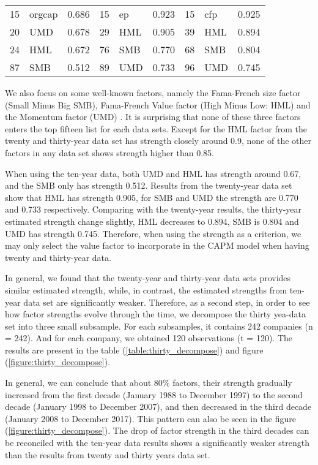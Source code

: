 \begin{table}[]
\begin{tabular}{llc|llc|llc}
		15 & orgcap         & 0.686    &15      & ep            & 0.923       &15     & cfp          & 0.925 \\ 
		20 & UMD            & 0.678    & 29     & HML        & 0.905      & 39     & HML       & 0.894 \\
		24 & HML            & 0.672    & 76     & SMB        & 0.770      & 68     & SMB        & 0.804 \\
		87 & SMB            & 0.512    & 89     & UMD        & 0.733      & 96     & UMD       & 0.745 \\ 
		\hline
	\end{tabular}
\end{table}

We also focus on some well-known factors, namely the Fama-French size factor (Small Minus Big SMB), Fama-French Value factor (High Minus Low: HML) \cite{Fama1992} and the Momentum factor (UMD) \cite{Carhart1997}.
It is surprising that none of these three factors enters the top fifteen list for each data sets.
Except for the HML factor from the twenty and thirty-year data set has strength closely around 0.9, none of the other factors in any data set shows strength higher than 0.85.

When using the ten-year data, both UMD and HML has strength around 0.67, and the SMB only has strength 0.512.
Results from the twenty-year data set show that HML has strength 0.905, for SMB and UMD the strength are 0.770 and 0.733 respectively.
Comparing with the twenty-year results, the thirty-year estimated strength change slightly, HML decreases to 0.894, SMB is 0.804 and UMD has strength 0.745.
Therefore, when using the strength as a criterion, we may only select the value factor to incorporate in the CAPM model when having twenty and thirty-year data.

In general, we found that the twenty-year and thirty-year data sets provides similar estimated strength, while, in contrast, the estimated strengths from ten-year data set are significantly weaker.
Therefore, as a second step, in order to see how factor strengths evolve through the time, we decompose the thirty yea-data set into three small subsample.
For each subsamples, it contains 242 companies (n = 242). 
And for each company, we obtained 120 observations (t = 120). 
The results are present in the table (\ref{table:thirty_decompose}) and figure (\ref{figure:thirty_decompose}).

In general, we can conclude that about 80\% factors, their strength gradually increased from the first decade (January 1988 to December 1997) to the second decade (January 1998 to December 2007), and then decreased in the third decade (January 2008 to December 2017).
This pattern can also be seen in the figure (\ref{figure:thirty_decompose}).
The drop of factor strength in the third decades can be reconciled with the ten-year data results shows a significantly weaker strength than the results from twenty and thirty years data set.


